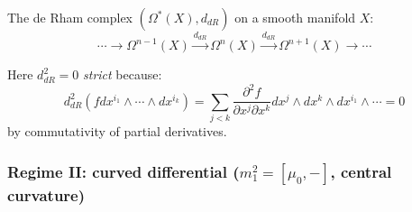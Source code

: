 \begin{example}
The de Rham complex $(\Omega^*(X), d_{dR})$ on a smooth manifold $X$:
\[\cdots \to \Omega^{n-1}(X) \xrightarrow{d_{dR}} \Omega^n(X) \xrightarrow{d_{dR}} 
\Omega^{n+1}(X) \to \cdots\]

Here $d_{dR}^2 = 0$ \emph{strict} because:
\[d_{dR}^2(f dx^{i_1} \wedge \cdots \wedge dx^{i_k}) 
= \sum_{j < k} \frac{\partial^2 f}{\partial x^j \partial x^k} dx^j \wedge dx^k \wedge dx^{i_1} 
\wedge \cdots = 0\]
by commutativity of partial derivatives.

\end{example}

\subsubsection{\texorpdfstring{Regime II: curved differential ($m_1^2 = [\mu_0, -]$, central curvature)}{Regime II: curved differential (m1 squared = commutator with mu0, central curvature)}}

\label{def:curved-ainfty-complete}

